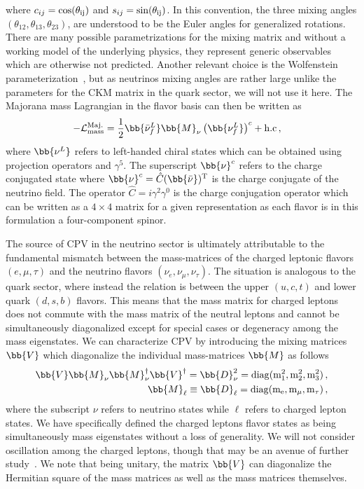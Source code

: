 where $c_{ij} = \rm{cos}(\theta_{ij})$ and $s_{ij} = \rm{sin}(\theta_{ij})$. In this convention, the three mixing angles $(\theta_{12}, \theta_{13}, \theta_{23})$, are understood to be the Euler angles for generalized rotations. There are many possible parametrizations for the mixing matrix and without a working model of the underlying physics, they represent generic observables which are otherwise not predicted. Another relevant choice is the Wolfenstein parameterization~\citep{wolfenstein1983parametrization}, but as neutrinos mixing angles are rather large unlike the parameters for the CKM matrix in the quark sector, we will not use it here. The Majorana mass Lagrangian in the flavor basis can then be written as
\begin{alignat}{1}
	\label{mass:1} -\mathcal{L}_{\rm{mass}}^{\rm{Maj.}}&=\frac{1}{2}\bb{\bar{\nu}_{f}^{L}}\bb{M}_{\nu}\left(\bb{\nu_{f}^{L}}\right)^{c}+\rm{h.c}\,,
\end{alignat}
where $\bb{\nu^{L}}$ refers to left-handed chiral states which can be obtained using projection operators and $\gamma^{5}$. The superscript $\bb{\nu}^{c}$ refers to the charge conjugated state where $\bb{\nu}^{c} = \hat{C}(\bb{\bar{\nu}})^\mathrm{T}$ is the charge conjugate of the neutrino field. The operator $\hat{C} = i\gamma^{2}\gamma^{0}$ is the charge conjugation operator which can be written as a $4\times4$ matrix for a given representation as each flavor is in this formulation a four-component spinor.

The source of CPV in the neutrino sector is ultimately attributable to the fundamental mismatch between the mass-matrices of the charged leptonic flavors $(e,\mu,\tau)$ and the neutrino flavors $(\nu_{e},\nu_{\mu},\nu_{\tau})$. The situation is analogous to the quark sector, where instead the relation is between the upper $(u,c,t)$ and lower quark $(d,s,b)$ flavors. This means that the mass matrix for charged leptons does not commute with the mass matrix of the neutral leptons and cannot be simultaneously diagonalized except for special cases or degeneracy among the mass eigenstates. We can characterize CPV by introducing the mixing matrices $\bb{V}$ which diagonalize the individual mass-matrices $\bb{M}$ as follows
\begin{alignat}{1}
	\label{diag:1} \bb{V}\bb{M}_{\nu}\bb{M}_{\nu}^{\dagger}\bb{V}^{\dagger} = \bb{D}_{\nu}^{2} = \rm{diag}(m_{1}^{2},m_{2}^{2},m_{3}^{2})\,,\\
    \label{diag:2} \bb{M}_{\ell} \equiv \bb{D}_{\ell} = \rm{diag}(m_{e},m_{\mu},m_{\tau})\,,
\end{alignat}
where the subscript $\nu$ refers to neutrino states while $\ell$ refers to charged lepton states. We have specifically defined the charged leptons flavor states as being simultaneously mass eigenstates without a loss of generality. We will not consider oscillation among the charged leptons, though that may be an avenue of further study~\citep{akhmedov2007charged}. We note that being unitary, the matrix $\bb{V}$ can diagonalize the Hermitian square of the mass matrices as well as the mass matrices themselves.